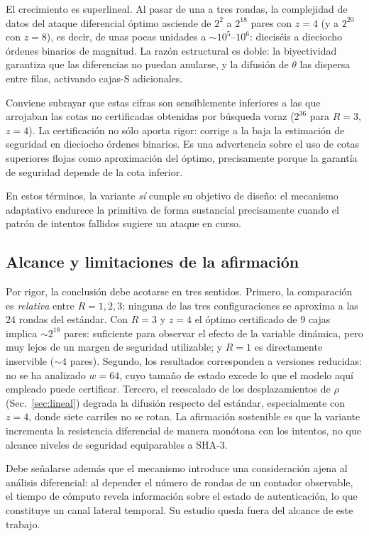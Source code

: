 \documentclass[conference]{IEEEtran}
\begin{document}
El crecimiento es superlineal. Al pasar de una a tres rondas, la complejidad de datos del
ataque diferencial óptimo asciende de $2^{2}$ a $2^{18}$ pares con $z=4$ (y a $2^{20}$ con
$z=8$), es decir, de unas pocas unidades a $\sim 10^{5}$--$10^{6}$: dieciséis a dieciocho
órdenes binarios de magnitud. La razón
estructural es doble: la biyectividad garantiza que las diferencias no puedan anularse, y
la difusión de $\theta$ las dispersa entre filas, activando cajas-S adicionales.

Conviene subrayar que estas cifras son sensiblemente inferiores a las que arrojaban las
cotas no certificadas obtenidas por búsqueda voraz ($2^{36}$ para $R=3$, $z=4$). La
certificación no sólo aporta rigor: corrige a la baja la estimación de seguridad en
dieciocho órdenes binarios. Es una advertencia sobre el uso de cotas superiores flojas
como aproximación del óptimo, precisamente porque la garantía de seguridad depende de la
cota inferior.

En estos términos, la variante \emph{sí} cumple su objetivo de diseño: el mecanismo
adaptativo endurece la primitiva de forma sustancial precisamente cuando el patrón de
intentos fallidos sugiere un ataque en curso.

\subsection{Alcance y limitaciones de la afirmación}

Por rigor, la conclusión debe acotarse en tres sentidos. Primero, la comparación es
\emph{relativa} entre $R=1,2,3$; ninguna de las tres configuraciones se aproxima a las
$24$ rondas del estándar. Con $R=3$ y $z=4$ el óptimo certificado de $9$ cajas implica
$\sim2^{18}$ pares: suficiente para observar el efecto de la variable dinámica, pero muy
lejos de un margen de seguridad utilizable; y $R=1$ es directamente inservible ($\sim4$
pares). Segundo, los resultados corresponden a versiones reducidas: no se ha analizado
$w=64$, cuyo tamaño de estado excede lo que el modelo aquí empleado puede certificar.
Tercero, el reescalado de los desplazamientos de $\rho$ (Sec.~\ref{sec:lineal}) degrada la difusión
respecto del estándar, especialmente con $z=4$, donde siete carriles no se rotan. La
afirmación sostenible es que la variante incrementa la resistencia diferencial de manera
monótona con los intentos, no que alcance niveles de seguridad equiparables a SHA-3.

Debe señalarse además que el mecanismo introduce una consideración ajena al análisis
diferencial: al depender el número de rondas de un contador observable, el tiempo de
cómputo revela información sobre el estado de autenticación, lo que constituye un canal
lateral temporal. Su estudio queda fuera del alcance de este trabajo.
\end{document}
